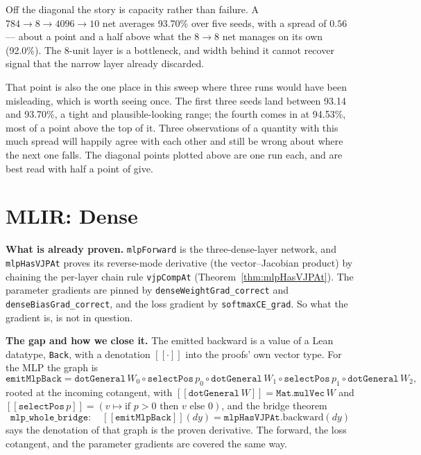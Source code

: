 \medskip\noindent Off the diagonal the story is capacity rather than
failure. A $784{\to}8{\to}4096{\to}10$ net averages 93.70\%
over five seeds, with a spread of $0.56$ --- about a point and a half
above what the $8{\to}8$ net manages on its own (92.0\%). The 8-unit
layer is a bottleneck, and width behind it cannot recover signal that the
narrow layer already discarded.

That point is also the one place in this sweep where three runs would
have been misleading, which is worth seeing once. The first three seeds
land between 93.14 and 93.70\%, a tight and plausible-looking range; the
fourth comes in at 94.53\%, most of a point above the top of it. Three
observations of a quantity with this much spread will happily agree with
each other and still be wrong about where the next one falls. The
diagonal points plotted above are one run each, and are best read with
half a point of give.

\section{MLIR: Dense}

\noindent\textbf{What is already proven.} \texttt{mlpForward} is the
three-dense-layer network, and \texttt{mlpHasVJPAt} proves its
reverse-mode derivative (the vector--Jacobian product) by chaining the
per-layer chain rule \texttt{vjpCompAt}
(Theorem~\ref{thm:mlpHasVJPAt}). The parameter gradients are
pinned by \texttt{denseWeightGrad\_correct} and
\texttt{denseBiasGrad\_correct}, and the loss gradient by
\texttt{softmaxCE\_grad}. So what the gradient is, is not in
question.

\medskip\noindent\textbf{The gap and how we close it.} The emitted
backward is a value of a Lean datatype, \texttt{Back}, with a denotation
$[\![\cdot]\!]$ into the proofs' own vector type. For the MLP the graph is
\[
  \texttt{emitMlpBack}
  = \texttt{dotGeneral}\,W_0 \circ \texttt{selectPos}\,p_0
    \circ \texttt{dotGeneral}\,W_1 \circ \texttt{selectPos}\,p_1
    \circ \texttt{dotGeneral}\,W_2,
\]
rooted at the incoming cotangent, with
$[\![\texttt{dotGeneral}\,W]\!] = \texttt{Mat.mulVec}\,W$ and
$[\![\texttt{selectPos}\,p]\!] = (v \mapsto \text{if } p>0 \text{ then }
v \text{ else } 0)$, and the bridge theorem
\[
  \texttt{mlp\_whole\_bridge}:\quad
  [\![\texttt{emitMlpBack}]\!](dy)
  = \texttt{mlpHasVJPAt}.\mathrm{backward}(dy)
\]
says the denotation of that graph is the proven derivative. The forward,
the loss cotangent, and the parameter gradients are covered the same way.

